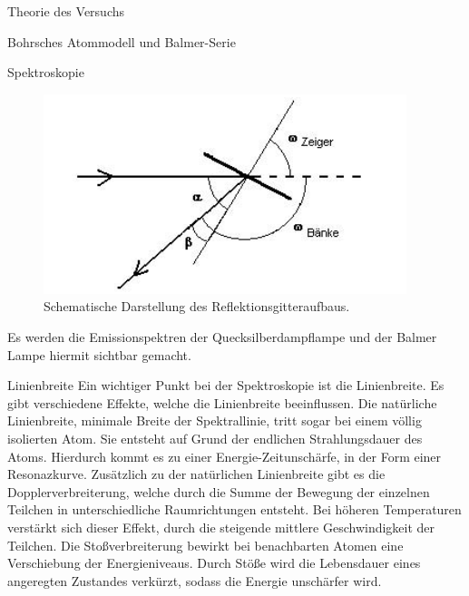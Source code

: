 \documentclass[pdftex, a4paper,11pt, twoside, ngerman]{report}
\begin{document}
\begin{chapter}{Theorie des Versuchs}
\begin{section}{Bohrsches Atommodell und Balmer-Serie}
\begin{subsection}{Spektroskopie}
        \begin{figure}[htbp]
          \begin{center}
            \includegraphics[width=.8\textwidth]{Figures/Gitteraufbau.png}
            \caption{Schematische Darstellung des Reflektionsgitteraufbaus.
                \cite{bib:LDDidactic}}
            \label{fig:Gitteraufbau}
          \end{center}
        \end{figure}
        
        Es werden die Emissionspektren der Quecksilberdampflampe und der Balmer
        Lampe hiermit sichtbar gemacht.
      
      \end{subsection}
      
      
      
      \begin{subsection}{Linienbreite}
        \label{chp:TheorieBohrBalmerSerieLinienbreite}
        Ein wichtiger Punkt bei der Spektroskopie ist die Linienbreite. Es gibt
        verschiedene Effekte, welche die Linienbreite beeinflussen. Die 
        natürliche Linienbreite, minimale Breite der Spektrallinie, tritt 
        sogar bei einem völlig isolierten Atom. Sie entsteht auf Grund der 
        endlichen Strahlungsdauer des Atoms. Hierdurch kommt es zu einer 
        Energie-Zeitunschärfe, in der Form einer Resonazkurve. Zusätzlich zu 
        der natürlichen Linienbreite gibt es die Dopplerverbreiterung, welche 
        durch die Summe  der Bewegung der einzelnen Teilchen in 
        unterschiedliche Raumrichtungen entsteht. Bei höheren Temperaturen 
        verstärkt sich dieser Effekt, durch die steigende mittlere 
        Geschwindigkeit der Teilchen. Die Stoßverbreiterung bewirkt bei 
        benachbarten Atomen eine Verschiebung der Energieniveaus. Durch Stöße 
        wird die Lebensdauer eines angeregten Zustandes verkürzt, sodass die 
        Energie unschärfer wird.
        
        
      \end{subsection}
      
    \end{section}

  \end{chapter}
\end{document}
